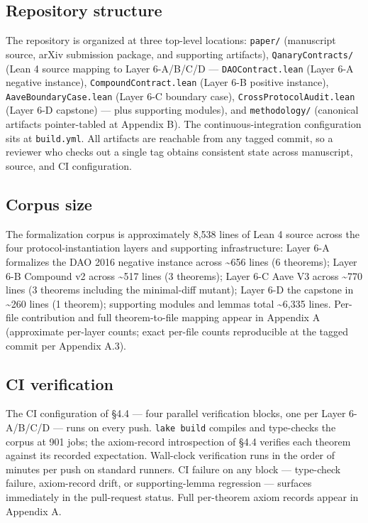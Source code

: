 \subsection{Repository structure}\label{repository-structure}

The repository is organized at three top-level locations:
\texttt{paper/} (manuscript source, arXiv submission package, and
supporting artifacts), \texttt{QanaryContracts/} (Lean 4 source mapping
to Layer 6-A/B/C/D --- \texttt{DAOContract.lean} (Layer 6-A negative
instance), \texttt{CompoundContract.lean} (Layer 6-B positive instance),
\texttt{AaveBoundaryCase.lean} (Layer 6-C boundary case),
\texttt{CrossProtocolAudit.lean} (Layer 6-D capstone) --- plus
supporting modules), and \texttt{methodology/} (canonical artifacts
pointer-tabled at Appendix B). The continuous-integration configuration
sits at \texttt{build.yml}. All artifacts are reachable from any tagged
commit, so a reviewer who checks out a single tag obtains consistent
state across manuscript, source, and CI configuration.

\subsection{Corpus size}\label{corpus-size}

The formalization corpus is approximately 8,538 lines of Lean 4 source
across the four protocol-instantiation layers and supporting
infrastructure: Layer 6-A formalizes the DAO 2016 negative instance
across \textasciitilde656 lines (6 theorems); Layer 6-B Compound v2
across \textasciitilde517 lines (3 theorems); Layer 6-C Aave V3 across
\textasciitilde770 lines (3 theorems including the minimal-diff mutant);
Layer 6-D the capstone in \textasciitilde260 lines (1 theorem);
supporting modules and lemmas total \textasciitilde6,335 lines. Per-file
contribution and full theorem-to-file mapping appear in Appendix A
(approximate per-layer counts; exact per-file counts reproducible at the
tagged commit per Appendix A.3).

\subsection{CI verification}\label{ci-verification}

The CI configuration of §4.4 --- four parallel verification blocks, one
per Layer 6-A/B/C/D --- runs on every push. \texttt{lake\ build}
compiles and type-checks the corpus at 901 jobs; the axiom-record
introspection of §4.4 verifies each theorem against its recorded
expectation. Wall-clock verification runs in the order of minutes per
push on standard runners. CI failure on any block --- type-check
failure, axiom-record drift, or supporting-lemma regression --- surfaces
immediately in the pull-request status. Full per-theorem axiom records
appear in Appendix A.

